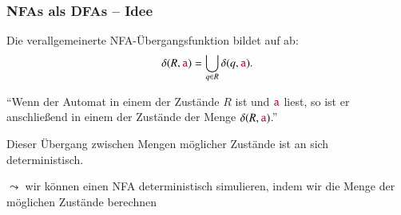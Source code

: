 \documentclass[aspectratio=1610,onlymath]{beamer}
\begin{document}
\begin{frame}\frametitle{NFAs als DFAs -- Idee}

Die verallgemeinerte NFA-Übergangsfunktion bildet  auf
 ab:
\[\delta(R,\mathtt{\textcolor{purple}{a}})=\bigcup_{q\in R}\delta(q,\mathtt{\textcolor{purple}{a}}).\]

\alert{"`Wenn der Automat in einem der Zustände $R$ ist und $\mathtt{\textcolor{purple}{a}}$ liest, so ist er anschließend in einem der Zustände der Menge $\delta(R,\mathtt{\textcolor{purple}{a}})$."'}
\medskip

Dieser Übergang zwischen Mengen möglicher Zustände ist an sich deterministisch.
\bigskip

$\leadsto$ wir können einen NFA deterministisch simulieren, indem wir die Menge der möglichen Zustände berechnen

\end{frame}
\end{document}
